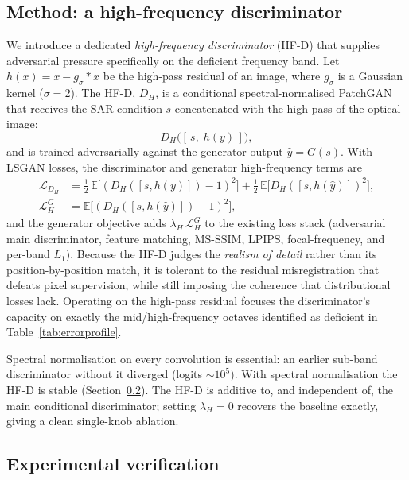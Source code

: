 \subsection{Method: a high-frequency discriminator}
\label{sec:hfd:hfd}

We introduce a dedicated \emph{high-frequency discriminator} (HF-D) that supplies adversarial
pressure specifically on the deficient frequency band. Let $h(x) = x - g_\sigma * x$ be the
high-pass residual of an image, where $g_\sigma$ is a Gaussian kernel ($\sigma=2$). The HF-D,
$D_H$, is a conditional spectral-normalised PatchGAN that receives the SAR condition $s$
concatenated with the high-pass of the optical image:
\begin{equation}
D_H\big([\,s,\; h(y)\,]\big),
\end{equation}
and is trained adversarially against the generator output $\hat{y}=G(s)$. With LSGAN losses,
the discriminator and generator high-frequency terms are
\begin{align}
\mathcal{L}_{D_H} &= \tfrac{1}{2}\,\mathbb{E}\big[(D_H([s,h(y)])-1)^2\big]
                   + \tfrac{1}{2}\,\mathbb{E}\big[D_H([s,h(\hat{y})])^2\big],\\
\mathcal{L}^{G}_{H} &= \mathbb{E}\big[(D_H([s,h(\hat{y})])-1)^2\big],
\end{align}
and the generator objective adds $\lambda_H\,\mathcal{L}^{G}_{H}$ to the existing loss stack
(adversarial main discriminator, feature matching, MS-SSIM, LPIPS, focal-frequency, and
per-band $L_1$). Because the HF-D judges the \emph{realism of detail} rather than its
position-by-position match, it is tolerant to the residual misregistration that defeats pixel
supervision, while still imposing the coherence that distributional losses lack. Operating on
the high-pass residual focuses the discriminator's capacity on exactly the mid/high-frequency
octaves identified as deficient in Table~\ref{tab:errorprofile}.

Spectral normalisation on every convolution is essential: an earlier sub-band discriminator
without it diverged (logits ${\sim}10^5$). With spectral normalisation the HF-D is stable
(Section~\ref{sec:hfd:exp}). The HF-D is additive to, and independent of, the main conditional
discriminator; setting $\lambda_H=0$ recovers the baseline exactly, giving a clean single-knob
ablation.

\subsection{Experimental verification}
\label{sec:hfd:exp}

